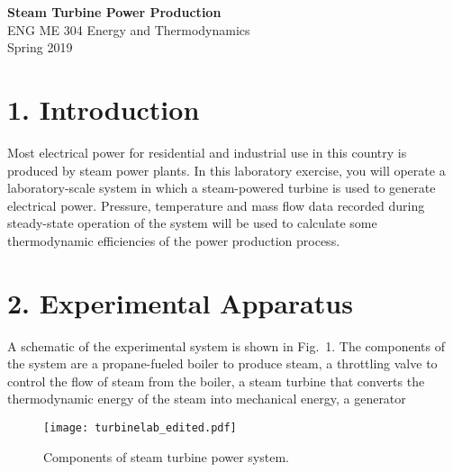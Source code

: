 \documentclass[12pt]{article}
\begin{document}
\begin{center}
{\bf Steam Turbine Power Production}\\ 
\vskip12pt 
ENG ME 304 Energy and Thermodynamics\\
Spring 2019
\end{center}
\vspace*{-12pt}

\section*{\normalsize \bf 1. Introduction}

\hspace*{\parindent} Most electrical power for residential and
industrial use in this country is produced by steam power plants.
In this laboratory exercise, you will operate a laboratory-scale
system in which a steam-powered turbine is used to generate
electrical power.  Pressure, temperature and mass flow 
data recorded during steady-state operation of the system will be
used to calculate some thermodynamic efficiencies of the power 
production process.

\section*{\normalsize \bf 2. Experimental Apparatus}

A schematic of the experimental system is shown in Fig.\ 1.  The
components of the system are a propane-fueled boiler to produce
steam, a throttling valve to control the flow of steam from the
boiler, a steam turbine that converts the thermodynamic energy
of the steam into mechanical energy, a generator \linebreak

\begin{figure}[htbp]
\begin{center}
\texttt{[image: turbinelab\_edited.pdf]}
\caption{Components of steam turbine power system.}
\label{default}
\end{center}
\end{figure}



\pagebreak
\end{document}
